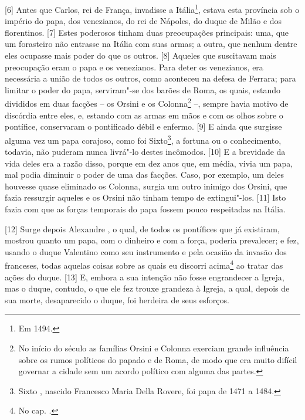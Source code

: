 {[}6{]} Antes que Carlos, rei de França, invadisse a Itália\footnote{Em
  1494.}, estava esta província sob o império do papa, dos venezianos,
do rei de Nápoles, do duque de Milão e dos florentinos. {[}7{]} Estes
poderosos tinham duas preocupações principais: uma, que um forasteiro
não entrasse na Itália com suas armas; a outra, que nenhum dentre eles
ocupasse mais poder do que os outros. {[}8{]} Aqueles que suscitavam
mais preocupação eram o papa e os venezianos. Para deter os venezianos,
era necessária a união de todos os outros, como aconteceu na defesa de
Ferrara; para limitar o poder do papa, serviram"-se dos barões de Roma,
os quais, estando divididos em duas facções -- os Orsini e os
Colonna\footnote{No início do século  as famílias Orsini e Colonna
  exerciam grande influência sobre os rumos políticos do papado e de
  Roma, de modo que era muito difícil governar a cidade sem um acordo
  político com alguma das partes.} --, sempre havia motivo de discórdia
entre eles, e, estando com as armas em mãos e com os olhos sobre o
pontífice, conservaram o pontificado débil e enfermo. {[}9{]} E ainda
que surgisse alguma vez um papa corajoso, como foi Sixto\footnote{Sixto
  , nascido Francesco Maria Della Rovere, foi papa de 1471 a 1484.}, a
fortuna ou o conhecimento, todavia, não puderam nunca livrá"-lo destes
incômodos. {[}10{]} E a brevidade da vida deles era a razão disso,
porque em dez anos que, em média, vivia um papa, mal podia diminuir o
poder de uma das facções. Caso, por exemplo, um deles houvesse quase
eliminado os Colonna, surgia um outro inimigo dos Orsini, que fazia
ressurgir aqueles e os Orsini não tinham tempo de extingui"-los. {[}11{]}
Isto fazia com que as forças temporais do papa fossem pouco respeitadas
na Itália.

{[}12{]} Surge depois Alexandre , o qual, de todos os pontífices que
já existiram, mostrou quanto um papa, com o dinheiro e com a força,
poderia prevalecer; e fez, usando o duque Valentino como seu instrumento
e pela ocasião da invasão dos franceses, todas aquelas coisas sobre as
quais eu discorri acima\footnote{No cap. .} ao tratar das ações do
duque. {[}13{]} E, embora a sua intenção não fosse engrandecer a Igreja,
mas o duque, contudo, o que ele fez trouxe grandeza à Igreja, a qual,
depois de sua morte, desaparecido o duque, foi herdeira de seus
esforços.

